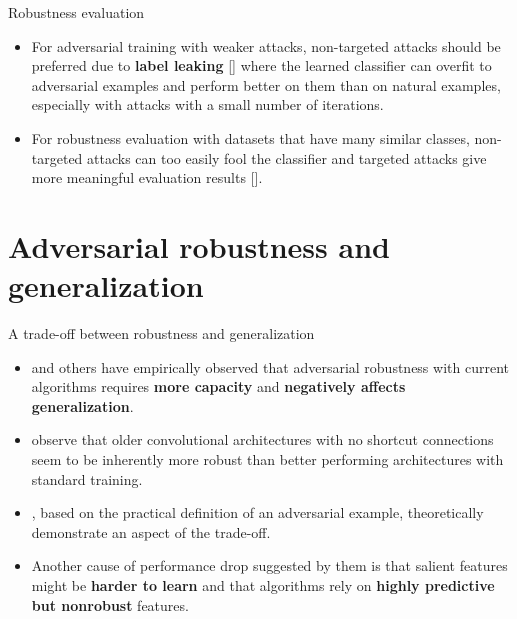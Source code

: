 \documentclass{beamer}
\newcommand{\citet}[1]{{\color{citecolor}\relscale{0.8}\textcite{#1}}}
\newcommand{\citep}[1]{{\color{citecolor}\relscale{0.8}[\textcite{#1}]}}
\begin{document}
\begin{subframe}[allowframebreaks=0.9]{Robustness evaluation}
	\begin{itemize}
		\item For adversarial training with weaker attacks, non-targeted attacks should be preferred due to \textbf{label leaking} \citep{Kurakin:2016:AMLS} where the learned classifier can overfit to adversarial examples and perform better on them than on natural examples, especially with attacks with a small number of iterations. 
		\item For robustness evaluation with datasets that have many similar classes, non-targeted attacks can too easily fool the classifier and targeted attacks give more meaningful evaluation results \citep{Athalye:2018:OGGFSS}.
	\end{itemize}
\end{subframe}

\section{Adversarial robustness and generalization} \label{sec:robustness-generalization}

\begin{frame}[allowframebreaks=0.9]{A trade-off between robustness and generalization}
	\begin{itemize}
		\item \citet{Madry:2017:TDLMRAA,Su:2017:OPAFDNN,Tsipras:2018:RMBOA} and others have empirically observed that adversarial robustness with current algorithms requires \textbf{more capacity} and \textbf{negatively affects generalization}. 
		\item \citet{Su:2017:OPAFDNN} observe that older convolutional architectures with no shortcut connections
		seem to be inherently more robust than better performing architectures
		with standard training.
		\item \citet{Tsipras:2018:RMBOA}, based on the practical definition of an adversarial example, theoretically demonstrate an aspect of the trade-off. 
		\item Another cause of performance drop suggested by them is that salient features might be \textbf{harder to learn} and that algorithms rely on \textbf{highly predictive but nonrobust} features.
	\end{itemize}
\end{frame}
\end{document}
